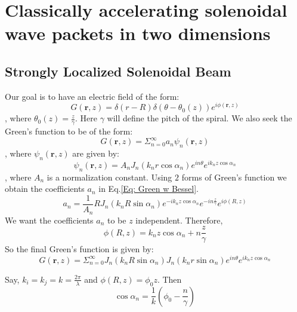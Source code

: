 \chapter{Classically accelerating solenoidal wave packets in two dimensions}
\label{ch:accelerating}

\section{Strongly Localized Solenoidal Beam}
Our goal is to have an electric field of the form:
\begin{equation}\label{Eq: Green spiral}
G(\mathbf{r}, z) = \delta (r-R)\delta (\theta - \theta_{0}(z)) e^{i\phi (\mathbf{r}, z)}
\end{equation}
, where $\theta_{0}(z) = \frac{z}{\gamma}$. Here $\gamma$ will define the pitch of the spiral. We also seek the Green's function to be of the form:
\begin{equation}\label{Eq: Green w Bessel}
G(\mathbf{r}, z) = \Sigma _{n=0}^{\infty}a_n \psi _{n}(\mathbf{r},z)
\end{equation}
, where $\psi_{n} (\mathbf{r}, z)$ are given by:
\begin{equation}\label{Eq: Bessel fn}
\psi_{n}(\mathbf{r}, z) = A_{n}J_{n}(k_{n}r \cos\alpha _n)e^{in\theta}e^{ik_{n}z\cos\alpha _n}
\end{equation}
, where $A_n$ is a normalization constant. Using $2$ forms of Green's function we obtain the coefficients $a_n$ in Eq.\ref{Eq: Green w Bessel}. 
\begin{equation}\label{Eq: Green coeff}
a_{n} = \frac{1}{A_n}R J_{n}(k_n R \sin\alpha _n)e^{-i k_n z \cos\alpha _n}e^{-in\frac{z}{\gamma}}e^{i\phi(R,z)}
\end{equation}
We want the coefficients $a_n$ to be $z$ independent. Therefore,
\begin{equation}\label{Eq: phi reln.}
\phi(R,z) = k_nz\cos\alpha _n + n\frac{z}{\gamma}
\end{equation}
So the final Green's function is given by:
\begin{equation}\label{Eq: Green final}
G(\textbf{r},z) = \Sigma _{n=0}^{\infty} J_n(k_n R \sin\alpha _n)J_{n}(k_n r \sin\alpha _n) e^{in\theta}e^{ik_n z\cos\alpha _n}
\end{equation}

Say, $k_i = k_j = k = \frac{2 \pi}{\lambda}$ and $\phi (R,z) = \phi _0 z$. Then 
\begin{equation}\label{Eq: cos alpha}
\cos\alpha _n = \frac{1}{k}(\phi _0 - \frac{n}{\gamma})
\end{equation}
